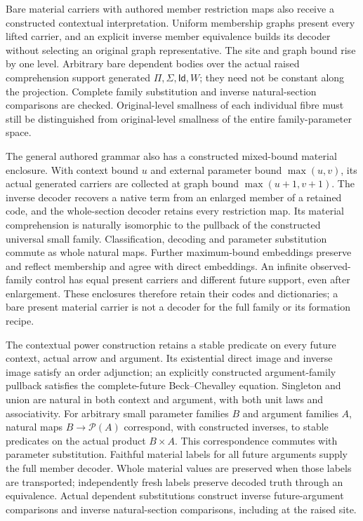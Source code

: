 \documentclass[11pt]{article}
\theoremstyle{definition}
\theoremstyle{remark}
\begin{document}
Bare material carriers with authored member restriction maps also receive a
constructed contextual interpretation.  Uniform membership graphs present
every lifted carrier, and an explicit inverse member equivalence builds its
decoder without selecting an original graph representative.  The site and
graph bound rise by one level.  Arbitrary bare dependent bodies over the
actual raised comprehension support generated $\Pi,\Sigma,\mathsf{Id},W$;
they need not be constant along the projection.  Complete family substitution
and inverse natural-section comparisons are checked.  Original-level
smallness of each individual fibre must still be distinguished from
original-level smallness of the entire family-parameter space.

The general authored grammar also has a constructed mixed-bound material
enclosure.  With context bound \(u\) and external parameter bound
\(\max(u,v)\), its actual generated carriers are collected at graph bound
\(\max(u+1,v+1)\).  The inverse decoder recovers a native term from an
enlarged member of a retained code, and the whole-section decoder retains
every restriction map.  Its material comprehension is naturally
isomorphic to the pullback of the constructed universal small family.
Classification, decoding and parameter substitution commute as whole
natural maps.  Further maximum-bound embeddings preserve and reflect
membership and agree with direct embeddings.  An infinite observed-family
control has equal present carriers and different future support, even
after enlargement.  These enclosures therefore retain their codes and
dictionaries; a bare present material carrier is not a decoder for the
full family or its formation recipe.

The contextual power construction retains a stable predicate on every
future context, actual arrow and argument.  Its existential direct image
and inverse image satisfy an order adjunction; an explicitly constructed
argument-family pullback satisfies the complete-future Beck--Chevalley
equation.  Singleton and union are natural in both context and argument,
with both unit laws and associativity.  For arbitrary small parameter
families $B$ and argument families $A$, natural maps
$B\to\mathcal P(A)$ correspond, with constructed inverses, to stable
predicates on the actual product $B\times A$.  This correspondence
commutes with parameter substitution.  Faithful material labels for all
future arguments supply the full member decoder.  Whole material values
are preserved when those labels are transported; independently fresh
labels preserve decoded truth through an equivalence.  Actual dependent
substitutions construct inverse future-argument comparisons and inverse
natural-section comparisons, including at the raised site.
\end{document}
